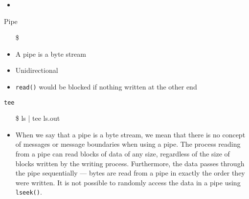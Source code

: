 \begin{itemize}
\item {}
\end{itemize}

\begin{frame}{Pipe}
  \begin{itemize}
  \item[\$] 
  \end{itemize}
  \centering%
  \mode<beamer>{ \texttt{[image: pipe-ls-wc]} }%

  \begin{itemize}
  \item A pipe is a byte stream
  \item Unidirectional
  \item \texttt{read()} would be blocked if nothing written at the other end
  \end{itemize}
  \ttfamily
  \begin{iblock}{\texttt{tee}}
    \begin{minipage}{.35\linewidth}
      \begin{itemize}
      \item[\$] ls | tee ls.out
      \end{itemize}
    \end{minipage}\quad
    \begin{minipage}{.45\linewidth}
    \end{minipage}
  \end{iblock}
\end{frame}

\begin{itemize}
\item When we say that a pipe is a byte stream, we mean that there is no concept of
  messages or message boundaries when using a pipe. The process reading from a pipe can
  read blocks of data of any size, regardless of the size of blocks written by the writing
  process. Furthermore, the data passes through the pipe sequentially --- bytes are read from
  a pipe in exactly the order they were written. It is not possible to randomly access the
  data in a pipe using \texttt{lseek()}. 
\end{itemize}


